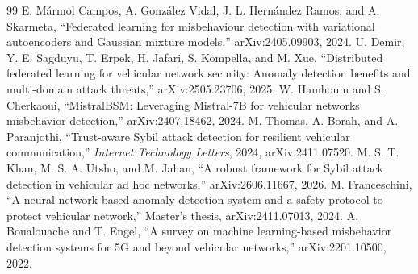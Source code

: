 \documentclass[conference]{IEEEtran}
\begin{document}
\begin{thebibliography}{99}
 E. M\'armol Campos, A. Gonz\'alez Vidal, J. L. Hern\'andez Ramos, and A. Skarmeta, ``Federated learning for misbehaviour detection with variational autoencoders and Gaussian mixture models,'' arXiv:2405.09903, 2024.
 U. Demir, Y. E. Sagduyu, T. Erpek, H. Jafari, S. Kompella, and M. Xue, ``Distributed federated learning for vehicular network security: Anomaly detection benefits and multi-domain attack threats,'' arXiv:2505.23706, 2025.
 W. Hamhoum and S. Cherkaoui, ``MistralBSM: Leveraging Mistral-7B for vehicular networks misbehavior detection,'' arXiv:2407.18462, 2024.
 M. Thomas, A. Borah, and A. Paranjothi, ``Trust-aware Sybil attack detection for resilient vehicular communication,'' \emph{Internet Technology Letters}, 2024, arXiv:2411.07520.
 M. S. T. Khan, M. S. A. Utsho, and M. Jahan, ``A robust framework for Sybil attack detection in vehicular ad hoc networks,'' arXiv:2606.11667, 2026.
 M. Franceschini, ``A neural-network based anomaly detection system and a safety protocol to protect vehicular network,'' Master's thesis, arXiv:2411.07013, 2024.
 A. Boualouache and T. Engel, ``A survey on machine learning-based misbehavior detection systems for 5G and beyond vehicular networks,'' arXiv:2201.10500, 2022.
\end{thebibliography}
\end{document}
